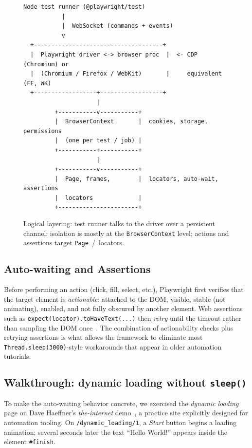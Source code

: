 \documentclass[12pt,letterpaper]{article}
\newcommand{\code}[1]{\texttt{#1}}
\begin{document}
\begin{figure}[H]
\centering
\begin{Verbatim}[frame=single,fontsize=\small,xleftmargin=6pt,xrightmargin=6pt]
  Node test runner (@playwright/test)
           |
           |  WebSocket (commands + events)
           v
  +-------------------------------------+
  |  Playwright driver <-> browser proc  |  <- CDP (Chromium) or
  |  (Chromium / Firefox / WebKit)       |     equivalent (FF, WK)
  +------------------+------------------+
                     |
         +-----------v-----------+
         |  BrowserContext       |  cookies, storage, permissions
         |  (one per test / job) |
         +-----------+-----------+
                     |
         +-----------v-----------+
         |  Page, frames,        |  locators, auto-wait, assertions
         |  locators             |
         +-----------------------+
\end{Verbatim}
\caption{Logical layering: test runner talks to the driver over a persistent channel; isolation is mostly at the \code{BrowserContext} level; actions and assertions target \code{Page}~/~locators.}
\label{fig:arch}
\end{figure}

\subsection{Auto-waiting and Assertions}

Before performing an action (click, fill, select, etc.), Playwright first verifies that the target element is \emph{actionable}: attached to the DOM, visible, stable (not animating), enabled, and not fully obscured by another element. Web assertions such as \code{expect(locator).toHaveText(...)} then \emph{retry} until the timeout rather than sampling the DOM once~\cite{pwdocs}. The combination of actionability checks plus retrying assertions is what allows the framework to eliminate most \code{Thread.sleep(3000)}-style workarounds that appear in older automation tutorials.

\subsection{Walkthrough: dynamic loading without \texttt{sleep()}}

To make the auto-waiting behavior concrete, we exercised the \emph{dynamic loading} page on Dave Haeffner's \emph{the-internet} demo~\cite{theinternet}, a practice site explicitly designed for automation tooling. On \code{/dynamic\_loading/1}, a \emph{Start} button begins a loading animation; several seconds later the text ``Hello World!'' appears inside the element \code{\#finish}.
\end{document}
